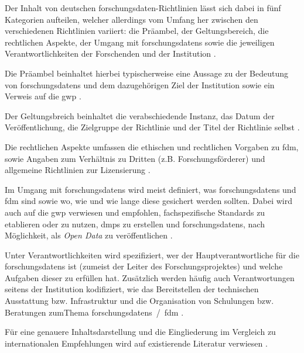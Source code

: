Der Inhalt von deutschen \gls{forschungsdaten}-Richtlinien lässt sich dabei in fünf Kategorien aufteilen, welcher allerdings vom Umfang her zwischen den verschiedenen Richtlinien variiert:
die Präambel, der Geltungsbereich, die rechtlichen Aspekte, der Umgang mit \glspl{forschungsdaten} sowie die jeweiligen Verantwortlichkeiten der Forschenden und der Institution \autocite{Hiemenz2018-fdm-report}.

Die Präambel beinhaltet hierbei typischerweise eine Aussage zu der Bedeutung von \glspl{forschungsdaten} und dem dazugehörigen Ziel der Institution sowie ein Verweis auf die \gls{gwp} \autocite{Hiemenz2018-fdm-report}.

Der Geltungsbreich beinhaltet die verabschiedende Instanz, das Datum der Veröffentlichung, die Zielgruppe der Richtlinie und der Titel der Richtlinie selbst \autocite{Hiemenz2018-fdm-report}.

Die rechtlichen Aspekte umfassen die ethischen und rechtlichen Vorgaben zu \gls{fdm}, sowie Angaben zum Verhältnis zu Dritten (z.B. Forschungsförderer) und allgemeine Richtlinien zur Lizensierung \autocite{Hiemenz2018-fdm-report}.

Im Umgang mit \glspl{forschungsdaten} wird meist definiert, was \glspl{forschungsdaten} und \gls{fdm} sind sowie wo, wie und wie lange diese gesichert werden sollten.
Dabei wird auch auf die \gls{gwp} verwiesen und empfohlen, fachspezifische Standards zu etablieren oder zu nutzen, \glspl{dmp} zu erstellen und \glspl{forschungsdaten}, nach Möglichkeit, als \textit{Open Data} zu veröffentlichen \autocite{Hiemenz2018-fdm-report}.

Unter Verantwortlichkeiten wird spezifiziert, wer der Hauptverantwortliche für die \glspl{forschungsdaten} ist (zumeist der Leiter des Forschungsprojektes) und welche Aufgaben dieser zu erfüllen hat.
Zusätzlich werden häufig auch Verantwortungen seitens der Institution kodifiziert, wie das Bereitstellen der technischen Ausstattung bzw. Infrastruktur und die Organisation von Schulungen bzw. Beratungen zumThema \glspl{forschungsdaten}~/~\gls{fdm} \autocite{Hiemenz2018-fdm-report}.

Für eine genauere Inhaltsdarstellung und die Eingliederung im Vergleich zu internationalen Empfehlungen wird auf existierende Literatur verwiesen \autocite{Hiemenz2018-fdm-report}.

